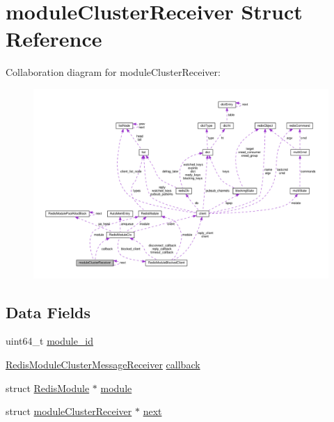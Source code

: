 \hypertarget{structmodule_cluster_receiver}{}\section{module\+Cluster\+Receiver Struct Reference}
\label{structmodule_cluster_receiver}


Collaboration diagram for module\+Cluster\+Receiver\+:
\nopagebreak
\begin{figure}[H]
\begin{center}
\leavevmode
\includegraphics[width=350pt]{structmodule_cluster_receiver__coll__graph}
\end{center}
\end{figure}
\subsection*{Data Fields}
\begin{DoxyCompactItemize}
\item 
uint64\+\_\+t \hyperlink{structmodule_cluster_receiver_a5c568ad76933cdbb1f61b40781917492}{module\+\_\+id}
\item 
\hyperlink{redismodule_8h_ac409a6cb3005523c7d4f10ceb3164535}{Redis\+Module\+Cluster\+Message\+Receiver} \hyperlink{structmodule_cluster_receiver_a9bad2da2037959b9c0a7e79e93adf8da}{callback}
\item 
struct \hyperlink{struct_redis_module}{Redis\+Module} $\ast$ \hyperlink{structmodule_cluster_receiver_a0b5d3833feb2320585734795fb7f62b6}{module}
\item 
struct \hyperlink{structmodule_cluster_receiver}{module\+Cluster\+Receiver} $\ast$ \hyperlink{structmodule_cluster_receiver_aaa93837daad4aea905b795397a966c68}{next}
\end{DoxyCompactItemize}


